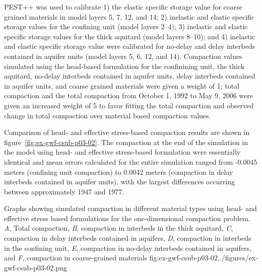 PEST++ \citep{welter2015approaches} was used to calibrate 1) the elastic specific storage value for coarse grained materials in model layers 5, 7, 12, and 14; 2) inelastic and elastic specific storage values for the confining unit (model layers 2--4); 3) inelastic and elastic specific storage values for the thick aquitard (model layers 8--10); and 4) inelastic and elastic specific storage value were calibrated for no-delay and delay interbeds contained in aquifer units (model layers 5, 6, 12, and 14). Compaction values simulated using the head-based formulation for the confinining unit, the thick aquitard, no-delay interbeds contained in aquifer units, delay interbeds contained in aquifer units, and coarse grained materials were given a weight of 1; total compaction and the total compaction from October 1, 1992 to May 9, 2006 were given an increased weight of 5 to favor fitting the total compaction and observed change in total compaction over material based compaction values.  

Comparison of head- and effective stress-based compaction results are shown in figure~\ref{fig:ex-gwf-csub-p03-02}. The compaction at the end of the simulation in the model using head- and effective stress-based formulation were essentially identical and mean errors calculated for the entire simulation ranged from -0.0045 meters (confining unit compaction) to 0.0042 meters (compaction in delay interbeds contained in aquifer units), with the largest differences occurring between approximately 1947 and 1977.

\begin{StandardFigure}{
                                      Graphs showing simulated compaction in different material types using head- 
                                      and effective stress based formulations for the one-dimensional compaction 
                                      problem. \textit{A}, Total compaction, \textit{B}, compaction in interbeds in the 
                                      thick aquitard, \textit{C}, compaction in delay interbeds contained in aquifers, 
                                      \textit{D}, compaction in interbeds in the confining unit, \textit{E}, compaction 
                                      in no-delay interbeds contained in aquifers, and \textit{F}, compaction in 
                                      coarse-grained materials
                                     }{fig:ex-gwf-csub-p03-02}{../figures/ex-gwf-csub-p03-02.png}
\end{StandardFigure}        

